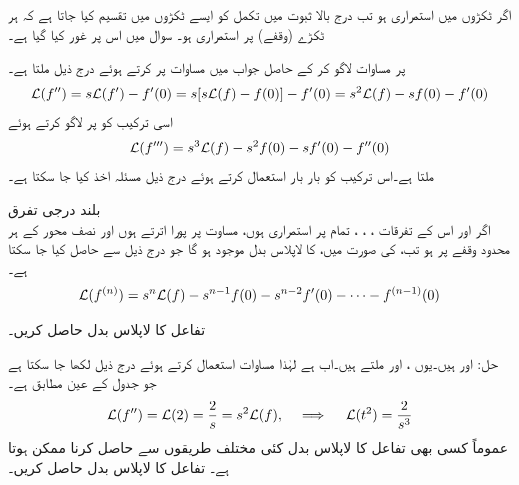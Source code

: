 اگر  ٹکڑوں میں استمراری ہو تب درج بالا ثبوت میں تکمل کو ایسے ٹکڑوں میں تقسیم کیا جاتا ہے کہ ہر ٹکڑے (وقفے) پر  استمراری ہو۔ سوال  میں اس پر غور کیا گیا ہے۔

 پر مساوات   لاگو کر کے حاصل جواب میں مساوات  پر کرتے ہوئے درج ذیل ملتا ہے۔
\begin{align}\label{مساوات_لاپلاس_درجہ_دوم_تفرق}
\mathcal{L}(f'')=s\mathcal{L}(f')-f'(0)=s[s\mathcal{L}(f)-f(0)]-f'(0)=s^2\mathcal{L}(f)-sf(0)-f'(0)
\end{align}
اسی ترکیب کو  پر لاگو کرتے ہوئے
\begin{align}\label{مساوات_لاپلاس_درجہ_تین_تفرق}
\mathcal{L}(f''')=s^3\mathcal{L}(f)-s^2f(0)-sf'(0)-f''(0)
\end{align}
ملتا ہے۔اس ترکیب کو بار بار استعمال کرتے ہوئے درج ذیل مسئلہ اخذ کیا جا سکتا ہے۔

\quad بلند درجی تفرق \\
اگر  اور اس کے تفرقات ، ، ،   تمام  پر استمراری ہوں، مساوت  پر پورا اترتے ہوں اور  نصف محور  کے ہر محدود وقفے پر  ہو تب،  کی صورت میں،  کا لاپلاس بدل موجود ہو گا جو درج ذیل سے حاصل کیا جا سکتا ہے۔
\begin{align}
\mathcal{L}(f^{(n)})=s^n\mathcal{L}(f)-s^{n-1}f(0)-s^{n-2}f'(0)-\cdots -f^{(n-1)}(0)
\end{align}

تفاعل  کا لاپلاس بدل حاصل کریں۔

حل: اور  ہیں۔یوں ،  اور  ملتے ہیں۔اب  ہے لہٰذا  مساوات  استعمال کرتے ہوئے درج ذیل لکھا جا سکتا ہے جو جدول  کے عین مطابق ہے۔
\begin{align*}
\mathcal{L}(f'')=\mathcal{L}(2)=\frac{2}{s}=s^2\mathcal{L}(f), \quad \implies \quad \mathcal{L}(t^2)=\frac{2}{s^3}
\end{align*}
عموماً کسی بھی تفاعل کا لاپلاس بدل کئی مختلف طریقوں سے حاصل کرنا ممکن ہوتا ہے۔
تفاعل  کا لاپلاس بدل حاصل کریں۔

